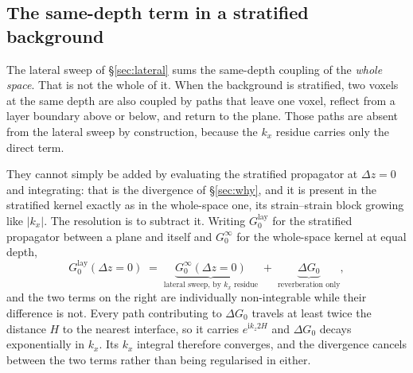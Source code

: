 \documentclass[11pt,a4paper]{article}
\newcommand{\ii}{\mathrm{i}}
\newcommand{\Gz}{G_0}
\begin{document}
\subsection{The same-depth term in a stratified background}
\label{sec:intraplane}

The lateral sweep of \S\ref{sec:lateral} sums the same-depth coupling of the \emph{whole space}.
That is not the whole of it. When the background is stratified, two voxels at the same depth are
also coupled by paths that leave one voxel, reflect from a layer boundary above or below, and
return to the plane. Those paths are absent from the lateral sweep by construction, because the
$k_x$ residue carries only the direct term.

They cannot simply be added by evaluating the stratified propagator at $\Delta z=0$ and
integrating: that is the divergence of \S\ref{sec:why}, and it is present in the stratified
kernel exactly as in the whole-space one, its strain--strain block growing like $|k_x|$. The
resolution is to subtract it. Writing $\Gz^{\mathrm{lay}}$ for the stratified propagator between
a plane and itself and $\Gz^{\infty}$ for the whole-space kernel at equal depth,
\begin{equation}
\label{eq:intrasplit}
\Gz^{\mathrm{lay}}(\Delta z = 0) \;=\; \underbrace{\Gz^{\infty}(\Delta z = 0)}_{\text{lateral sweep, by }k_x\text{ residue}}
\;+\; \underbrace{\Delta\Gz}_{\text{reverberation only}} ,
\end{equation}
and the two terms on the right are individually non-integrable while their difference is not.
Every path contributing to $\Delta\Gz$ travels at least twice the distance $H$ to the nearest
interface, so it carries $e^{\ii k_z 2H}$ and $\Delta\Gz$ decays exponentially in $k_x$. Its
$k_x$ integral therefore converges, and the divergence cancels between the two terms rather than
being regularised in either.
\end{document}
